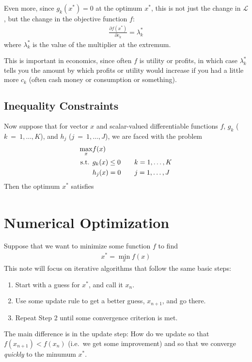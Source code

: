 \documentclass[a4paper,12pt]{scrartcl}
\theoremstyle{definition}
\theoremstyle{remark}
\begin{document}
Even more, since $g_k(x^*)=0$ at the optimum $x^*$, this is not just the
change in $\mathscr{L}$, but the change in the objective function $f$:
\begin{align*}
  \frac{\partial f(x^*)}{\partial c_k} = \lambda^*_k
\end{align*}
where $\lambda^*_k$ is the value of the multiplier at the extremum.

This is important in economics, since often $f$ is utility or profits,
in which case $\lambda^*_k$ tells you the amount by which profits or
utility would increase if you had a little more $c_k$ (often cash money
or consumption or something).

\subsection{Inequality Constraints}

Now suppose that for vector $x$ and scalar-valued differentiable
functions $f$, $g_k$ ($k~=~1,\ldots,K$), and $h_j$ ($j~=~1,\ldots,J$),
we are faced with the problem
\begin{align}
  \max_x &f(x) \label{prob:ineqconst}\\
  \text{s.t. } &g_k(x) \leq 0 \qquad k=1,\ldots,K\notag\\
               &h_j(x) =0 \qquad j=1,\ldots,J\notag
\end{align}
Then the optimum $x^*$ satisfies
\begin{align*}
\end{align*}




\clearpage
\section{Numerical Optimization}

Suppose that we want to minimize some function $f$ to find
\begin{align}
  \label{statement}
  x^* = \min_x f(x)
\end{align}
This note will focus on iterative algorithms that follow the same basic
steps:
\begin{enumerate}
  \item Start with a guess for $x^*$, and call it $x_n$.
  \item Use some update rule to get a better guess, $x_{n+1}$, and go
    there.
  \item Repeat Step 2 until some convergence criterion is met.
\end{enumerate}
The main difference is in the update step: How do we update so that
$f(x_{n+1}) < f(x_n)$ (i.e.\ we get some improvement) and so that we
converge \emph{quickly} to the minumum $x^*$.
\end{document}
